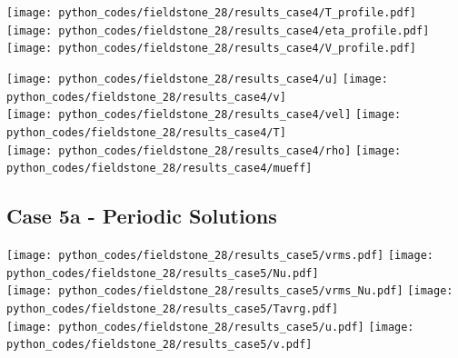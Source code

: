 \begin{center}
\texttt{[image: python\_codes/fieldstone\_28/results\_case4/T\_profile.pdf]}
\texttt{[image: python\_codes/fieldstone\_28/results\_case4/eta\_profile.pdf]}
\texttt{[image: python\_codes/fieldstone\_28/results\_case4/V\_profile.pdf]}
\end{center}

\newpage
\begin{center}
\texttt{[image: python\_codes/fieldstone\_28/results\_case4/u]}
\texttt{[image: python\_codes/fieldstone\_28/results\_case4/v]}\\
\texttt{[image: python\_codes/fieldstone\_28/results\_case4/vel]}
\texttt{[image: python\_codes/fieldstone\_28/results\_case4/T]}\\
\texttt{[image: python\_codes/fieldstone\_28/results\_case4/rho]}
\texttt{[image: python\_codes/fieldstone\_28/results\_case4/mueff]}
\end{center}

\newpage %
\subsection*{Case 5a - Periodic Solutions}

\begin{center}
\texttt{[image: python\_codes/fieldstone\_28/results\_case5/vrms.pdf]}
\texttt{[image: python\_codes/fieldstone\_28/results\_case5/Nu.pdf]}\\
\texttt{[image: python\_codes/fieldstone\_28/results\_case5/vrms\_Nu.pdf]}
\texttt{[image: python\_codes/fieldstone\_28/results\_case5/Tavrg.pdf]}\\
\texttt{[image: python\_codes/fieldstone\_28/results\_case5/u.pdf]}
\texttt{[image: python\_codes/fieldstone\_28/results\_case5/v.pdf]}
\end{center}


